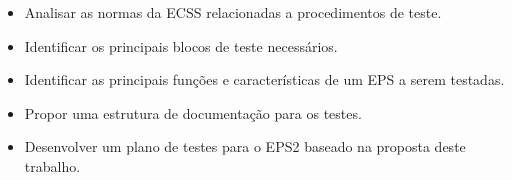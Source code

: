 \begin{itemize}
    \item Analisar as normas da ECSS relacionadas a procedimentos de teste.
    \item Identificar os principais blocos de teste necessários.
    \item Identificar as principais funções e características de um \gls{EPS} a serem testadas.
    \item Propor uma estrutura de documentação para os testes.
    \item Desenvolver um plano de testes para o \gls{EPS2} baseado na proposta deste trabalho.
\end{itemize}
